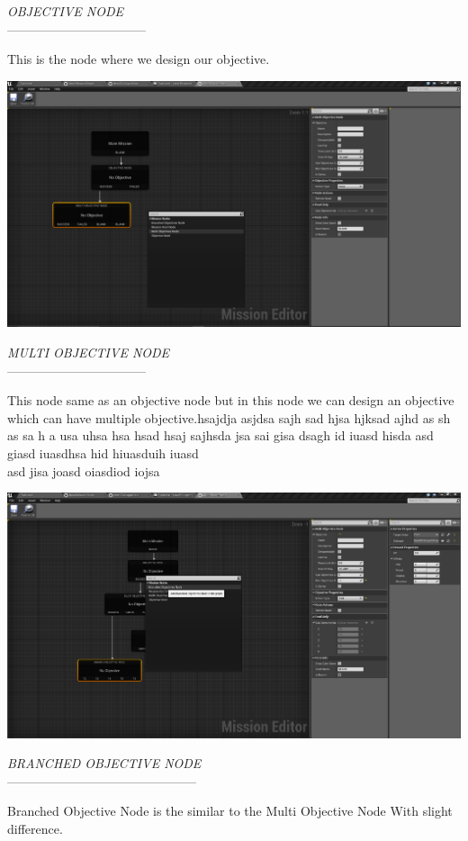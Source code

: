 \documentclass[12pt]{article}
\begin{document}
	  \begin{center}
	  \textit{OBJECTIVE NODE}\\
	  \----------------------------------
	  \end{center}
	  This is the node where we design our objective.
	   \begin{center}
	  \includegraphics[scale=0.2]{MultiObjectiveNode.png}
	  \end{center}
	  \begin{center}
	  \textit{MULTI OBJECTIVE NODE}\\
	  \----------------------------------
	  \end{center}
	  This node same as an objective node but in this node we can design an objective which can have multiple objective.hsajdja asjdsa sajh sad hjsa hjksad ajhd as sh as sa h
	  a usa uhsa hsa hsad hsaj sajhsda jsa sai gisa dsagh id iuasd hisda asd giasd iuasdhsa hid hiuasduih iuasd\\
	  asd jisa joasd oiasdiod iojsa
	   \begin{center}
	  \includegraphics[scale=0.2]{BranchedObjectiveNode.png}
	  \end{center}
	  \begin{center}
	  \textit{BRANCHED OBJECTIVE NODE}\\
	  \---------------------------------------------- 
	  \end{center}
	  	  Branched Objective Node is the similar to the Multi Objective Node With slight difference.\\
\end{document}
